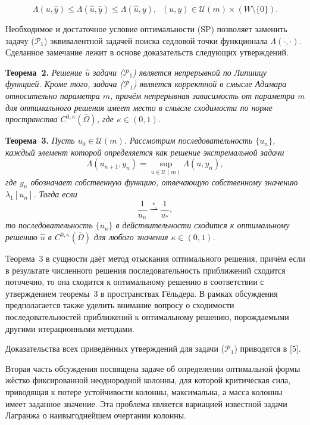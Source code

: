 \[
\Lambda(u, \hat{y})
\leq
\Lambda(\hat{u}, \hat{y})
\leq
\Lambda(\hat{u}, y),
\;\;
(u, y) \in \mathcal{U}(m) \times \left(W \setminus \{ 0 \}\right).
\tag{SP}
\]
%
%
%
\par
Необходимое и достаточное условие оптимальности (SP) позволяет заменить задачу ($\mathcal{P}_1$)
эквивалентной задачей поиска седловой точки функционала $\Lambda(\cdot, \cdot)$.
%
%
%
Сделанное замечание лежит в основе доказательств следующих утверждений.
%
%
%
\par
\textbf{Теорема~2.} {\it Решение $\hat{u}$ задачи \emph{($\mathcal{P}_1$)}
является непрерывной по Липшицу функцией.
%
%
%
Кроме того,
задача \emph{($\mathcal{P}_1$)} является корректной в смысле Адамара относительно параметра
$m$,
причём непрерывная зависимость от параметра $m$ для оптимального решения имеет место в смысле сходимости по норме пространства $C^{0,\kappa}(\bar{\Omega})$,
где $\kappa \in (0, 1)$.
}
%
%
%
\par
\textbf{Теорема~3.} {\it Пусть $u_0 \in \mathcal{U}(m)$.
%
%
%
Рассмотрим последовательность $\{ u_n \}$, каждый элемент которой определяется как решение
экстремальной задачи
\[
\Lambda(u_{n + 1}, y_n) = \sup_{u \in \mathcal{U}(m)} \Lambda(u, y_n),
\]
где
$y_n$ обозначает собственную функцию, отвечающую собственному значению $\lambda_1[u_n]$.
%
%
%
Тогда если
\[
\frac{1}{u_n}
\overset{*}{\rightharpoonup} \frac{1}{u_*},
\]
то последовательность $\{ u_n \}$ в действительности сходится
к оптимальному решению $\hat{u}$ в $C^{0,\kappa}(\bar{\Omega})$
для любого значения $\kappa \in (0, 1)$.
}
%
%
%
\par
Теорема~3 в сущности даёт метод отыскания оптимального решения,
причём если в результате численного решения последовательность приближений
сходится поточечно,
то она сходится к оптимальному решению в соответствии
с утверждением теоремы~3 в пространствах Гёльдера.
%
%
%
В рамках обсуждения предполагается также
уделить внимание вопросу о сходимости последовательностей приближений к оптимальному решению,
порождаемыми другими итерационными методами.
%
%
%
\par
Доказательства всех приведённых утверждений для задачи ($\mathcal{P}_1$) приводятся в [5].
%
%
%
\par
Вторая часть обсуждения посвящена задаче об определении оптимальной формы жёстко фиксированной неоднородной колонны,
для которой критическая сила,
приводящая к потере устойчивости колонны, максимальна,
а масса колонны имеет заданное значение.
%
%
%
Эта проблема является вариацией известной задачи Лагранжа о наивыгоднейшем очертании колонны.
